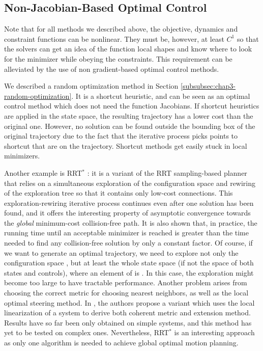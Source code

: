 \subsection{Non-Jacobian-Based Optimal Control}
\label{subsec:chap3-non-jacobian}

Note that for all methods we described above, the objective, dynamics
and constraint functions can be nonlinear. They must be, however, at
least $C^1$ so that the solvers can get an idea of the function local
shapes and know where to look for the minimizer while obeying the
constraints. This requirement can be alleviated by the use of non
gradient-based optimal control methods.

We described a random optimization method in Section
\ref{subsubsec:chap3-random-optimization}. It is a shortcut heuristic,
and can be seen as an optimal control method which does not need the
function Jacobians. If shortcut heuristics are applied in the state
space, the resulting trajectory has a lower cost than the original
one. However, no solution can be found outside the bounding box of the
original trajectory due to the fact that the iterative process picks
points to shortcut that are on the trajectory. Shortcut methods get
easily stuck in local minimizers.

Another example is RRT$^*$ \cite{Karaman2011}: it is a variant of the
RRT sampling-based planner that relies on a simultaneous exploration
of the configuration space and rewiring of the exploration tree so
that it contains only low-cost connections. This exploration-rewiring
iterative process continues even after one solution has been found,
and it offers the interesting property of asymptotic convergence
towards the \emph{global} minimum-cost collision-free path. It is also
shown that, in practice, the running time until an acceptable
minimizer is reached is greater than the time needed to find any
collision-free solution by only a constant factor. Of course, if we
want to generate an optimal trajectory, we need to explore not only
the configuration space {\cspace}, but at least the whole state space
{\sspace} (if not the space of both states and controls), where an
element of {\sspace} is \state{}. In this case, the exploration might
become too large to have tractable performance. Another problem arises
from choosing the correct metric for choosing nearest neighbors, as
well as the local optimal steering method. In \cite{Perez2012}, the
authors propose a variant which uses the local linearization of a
system to derive both coherent metric and extension method. Results
have so far been only obtained on simple systems, and this method has
yet to be tested on complex ones. Nevertheless, RRT$^*$ is an
interesting approach as only one algorithm is needed to achieve global
optimal motion planning.

